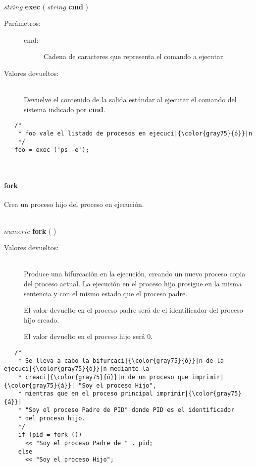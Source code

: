 \hfill \\ $string$ \textbf{exec} ( $string$ \textbf{cmd} )  
\begin{description}
\item [Parámetros:] \hfill 
   \begin{description}
   \item[cmd:] Cadena de caracteres que representa el comando a ejecutar
   \end{description}
\item[Valores devueltos:] \hfill \\
   Devuelve el contenido de la salida estándar al ejecutar el comando del sistema indicado por \textbf{cmd}.
\end{description}
     
\begin{lstlisting}   
   /*
    * foo vale el listado de procesos en ejecuci|{\color{gray75}{ó}}|n
    */
   foo = exec ('ps -e');
\end{lstlisting}
\hfill\\ 

\paragraph{fork}
Crea un proceso hijo del proceso en ejecución.


\hfill \\ $numeric$ \textbf{fork} ( )  
\begin{description}
\item[Valores devueltos:] \hfill \\
   Produce una bifurcación en la ejecución, creando un nuevo proceso copia del 
   proceso actual. La ejecución en el proceso hijo prosigue en la misma sentencia 
   y con el mismo estado que el proceso padre. 
   
   El valor devuelto en el proceso padre será de el identificador del proceso hijo creado. 
   
   El valor devuelto en el proceso hijo será $0$.
\end{description}
     
\begin{lstlisting}   
   /*
    * Se lleva a cabo la bifurcaci|{\color{gray75}{ó}}|n de la ejecuci|{\color{gray75}{ó}}|n mediante la 
    * creaci|{\color{gray75}{ó}}|n de un proceso que imprimir|{\color{gray75}{á}}| "Soy el proceso Hijo",
    * mientras que en el proceso principal imprimir|{\color{gray75}{á}}| 
    * "Soy el proceso Padre de PID" donde PID es el identificador
    * del proceso hijo.
    */
    if (pid = fork ()) 
      << "Soy el proceso Padre de " . pid;
    else
      << "Soy el proceso Hijo";
\end{lstlisting}
\hfill\\ 

